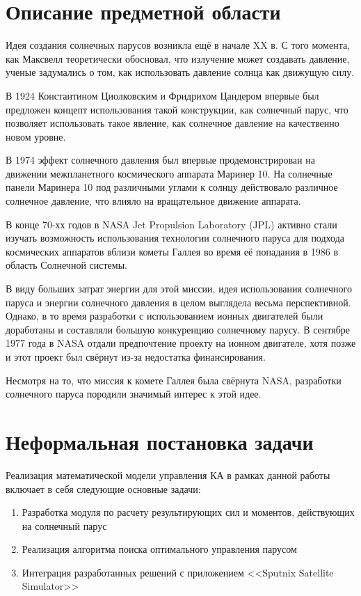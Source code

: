 \section{Описание предметной области}
\noindent\indent Идея создания солнечных парусов возникла ещё в начале XX в.
С того момента, как Максвелл теоретически обосновал, что излучение может создавать давление,
ученые задумались о том, как использовать давление солнца как движущую силу.\par
В 1924 Константином Циолковским и Фридрихом Цандером впервые был предложен концепт
использования такой конструкции, как солнечный парус, что позволяет использовать
такое явление, как солнечное давление на качественно новом уровне.\par
В 1974 эффект солнечного давления был впервые продемонстрирован на движении межпланетного
космического аппарата Маринер 10. На солнечные панели Маринера 10 под различными углами к солнцу
действовало различное солнечное давление, что влияло на вращательное движение аппарата.\par
В конце 70-хх годов в NASA Jet Propulsion Laboratory (JPL) активно стали изучать
возможность использования технологии солнечного паруса для подхода космических аппаратов
вблизи кометы Галлея во время её попадания в 1986 в область Солнечной системы.\par
В виду больших затрат энергии для этой миссии, идея использования солнечного паруса
и энергии солнечного давления в целом выглядела весьма перспективной.
Однако, в то время разработки с использованием ионных двигателей были доработаны и составляли
большую конкуренцию солнечному парусу. В сентябре 1977 года в NASA отдали предпочтение
проекту на ионном двигателе, хотя позже и этот проект был свёрнут из-за недостатка финансирования.\par
Несмотря на то, что миссия к комете Галлея была свёрнута NASA, разработки солнечного паруса
породили значимый интерес к этой идее.
\section{Неформальная постановка задачи}
\noindent\indent Реализация математической модели управления КА в рамках данной
работы включает в себя следующие основные задачи:
\begin{enumerate}[label=\arabic*.]
  \item Разработка модуля по расчету результирующих сил и моментов, действующих
  на солнечный парус
  \item Реализация алгоритма поиска оптимального управления парусом
  \item Интеграция разработанных решений с приложением <<Sputnix Satellite Simulator>>
\end{enumerate}
